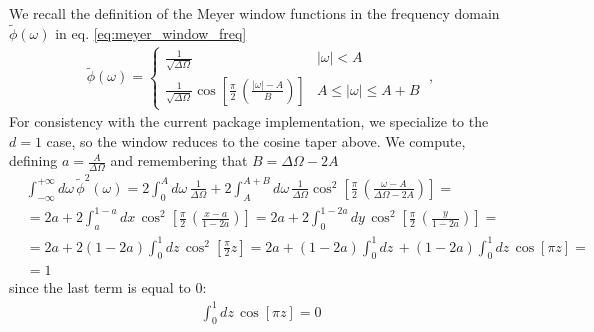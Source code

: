 \documentclass[%
 reprint,
superscriptaddress,
nofootinbib,
 amsmath,amssymb,
 aps,
colorlinks = true, 
linkcolor = blue, 
urlcolor = blue, 
citecolor = blue, 
anchorcolor = blue,
]{revtex4-2}
\begin{document}
We recall the definition of the Meyer window functions in the frequency domain $\tilde{\phi}(\omega)$ in eq. \eqref{eq:meyer_window_freq}
\begin{align}
\tilde\phi(\omega)=\left\{\begin{array}{lr}
\frac{1}{\sqrt{\Delta \Omega}} & |\omega|<A \\
\frac{1}{\sqrt{\Delta \Omega}} \cos \left[\frac{\pi}{2}\,\left( \frac{|\omega|-A}{B}\right)\right] &A \leq|\omega| \leq A+B
\end{array}\right.\;,
\end{align}
For consistency with the current package implementation, we specialize to the $d=1$ case, so the window reduces to the cosine taper above. We compute, defining $a=\frac{A}{\Delta\Omega}$ and remembering that $B=\Delta\Omega-2A$
%
\begin{align}
&\int_{-\infty}^{+\infty} d\omega\, \tilde{\phi}^2(\omega)=2\int_{0}^{A} d\omega\, \frac{1}{\Delta\Omega}+2\int_{A}^{A+B} d\omega\, \frac{1}{\Delta\Omega}\cos^2 \left[\frac{\pi}{2}\,\left( \frac{\omega-A}{\Delta\Omega-2A}\right)\right]=\nonumber\\
&=2a+2\int_a^{1-a}dx\,\cos^2 \left[\frac{\pi}{2}\,\left( \frac{x-a}{1-2a}\right)\right]=2a+2\int_0^{1-2a}dy\,\cos^2 \left[\frac{\pi}{2}\,\left( \frac{y}{1-2a}\right)\right]=\nonumber\\
&=2a+2(1-2a)\int_0^1 dz\,\cos^2 \left[\frac{\pi}{2} z\right]=2a+(1-2a)\int_0^1 dz\, +(1-2a)\int_0^1 dz\,\cos \left[\pi z\right]=\nonumber\\
&=1
\end{align}
%
since the last term is equal to 0:
%
\begin{align}
\int_0^1 dz\,\cos \left[\pi z\right]=0
\end{align}


\end{document}
